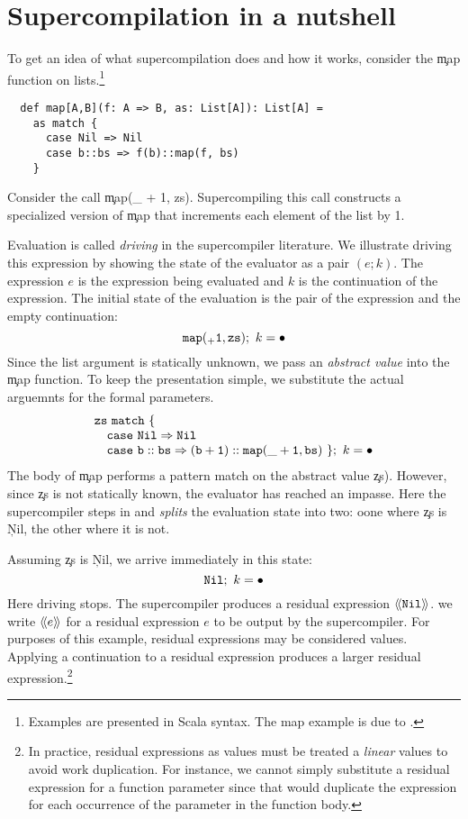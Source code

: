 \section{Supercompilation in a nutshell}
\label{sec:nutshell}

To get an idea of what supercompilation does and how it works, consider the
\c{map} function on lists.\footnote{Examples are presented in Scala syntax.
The map example is due to .}
\begin{verbatim}
  def map[A,B](f: A => B, as: List[A]): List[A] =
    as match {
      case Nil => Nil
      case b::bs => f(b)::map(f, bs)
    }
\end{verbatim}

Consider the call \c{map(_ + 1, zs)}.
Supercompiling this call constructs a specialized version of \c{map}
that increments each element of the list by 1.

Evaluation is called \emph{driving} in the supercompiler literature.
We illustrate driving this expression by showing the state of the evaluator
as a pair $(e; k)$. The expression $e$ is the expression being
evaluated and $k$ is the continuation of the expression.
The initial state of the evaluation is the pair of the expression and the
empty continuation:
  \[
    \c{map(_ + 1, zs)};~k = \bullet
  \]
Since the list argument is statically unknown, 
we pass an \emph{abstract value} into the 
\c{map} function.
To keep the presentation simple, we substitute the actual arguemnts for the
formal parameters.
  \[
    \begin{array}{l}
      \c{zs~match~\{} \\ 
    \c{~~~case~Nil \Rightarrow Nil}  \\
      \c{~~~case~b::bs \Rightarrow  (b+1)::map(\_+1, bs)~\}};~k = \bullet
  \end{array}
  \]
The body of \c{map}
performs a pattern match on the abstract value \c{zs}).
However, since \c{zs} is not statically known, the evaluator has reached an impasse.
Here the supercompiler steps in and 
\emph{splits} the evaluation state into two: oone where \c{zs} is \c{Nil}, the
other where it is not.

Assuming \c{zs} is \c{Nil}, we arrive immediately in this state:
    \[
      \c{Nil};~k = \bullet
    \]
Here driving stops.
The supercompiler produces a residual expression $\R{\c{Nil}}$.
we write
$\langle\!\langle e\rangle\!\rangle$ for a residual expression $e$ to be output 
by the supercompiler. For purposes of
this example, residual expressions may be considered values.
Applying a continuation to a residual expression produces a larger residual
expression.\footnote{In
practice, residual expressions as values
must be treated a \emph{linear} values to avoid work duplication.
For instance, we cannot simply substitute a residual expression
for a function parameter since that would duplicate the expression
for each occurrence of the parameter in the function body.}

